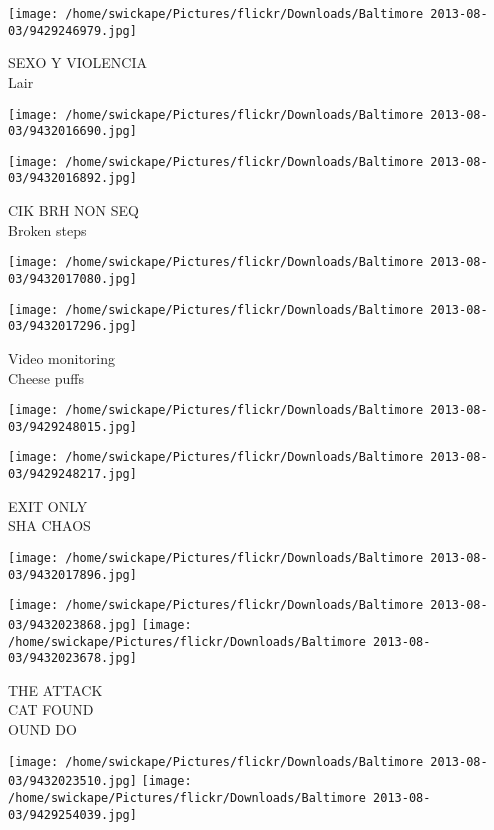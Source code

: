 \documentclass[10pt,letterpaper]{article}
\begin{document}
\vspace{0.25in}
\texttt{[image: /home/swickape/Pictures/flickr/Downloads/Baltimore 2013-08-03/9429246979.jpg]}

SEXO Y VIOLENCIA\\
Lair
\pagebreak

\texttt{[image: /home/swickape/Pictures/flickr/Downloads/Baltimore 2013-08-03/9432016690.jpg]}

\vspace{0.25in}
\texttt{[image: /home/swickape/Pictures/flickr/Downloads/Baltimore 2013-08-03/9432016892.jpg]}

CIK BRH NON SEQ\\
Broken steps
\pagebreak

\texttt{[image: /home/swickape/Pictures/flickr/Downloads/Baltimore 2013-08-03/9432017080.jpg]}

\vspace{0.25in}
\texttt{[image: /home/swickape/Pictures/flickr/Downloads/Baltimore 2013-08-03/9432017296.jpg]}

Video monitoring\\
Cheese puffs
\pagebreak

\texttt{[image: /home/swickape/Pictures/flickr/Downloads/Baltimore 2013-08-03/9429248015.jpg]}

\vspace{0.25in}
\texttt{[image: /home/swickape/Pictures/flickr/Downloads/Baltimore 2013-08-03/9429248217.jpg]}

EXIT ONLY\\
SHA CHAOS
\pagebreak

\texttt{[image: /home/swickape/Pictures/flickr/Downloads/Baltimore 2013-08-03/9432017896.jpg]}

\vspace{0.25in}
\texttt{[image: /home/swickape/Pictures/flickr/Downloads/Baltimore 2013-08-03/9432023868.jpg]}
\texttt{[image: /home/swickape/Pictures/flickr/Downloads/Baltimore 2013-08-03/9432023678.jpg]}

THE ATTACK\\
CAT FOUND\\
OUND DO
\pagebreak

\texttt{[image: /home/swickape/Pictures/flickr/Downloads/Baltimore 2013-08-03/9432023510.jpg]}
\texttt{[image: /home/swickape/Pictures/flickr/Downloads/Baltimore 2013-08-03/9429254039.jpg]}
\end{document}
